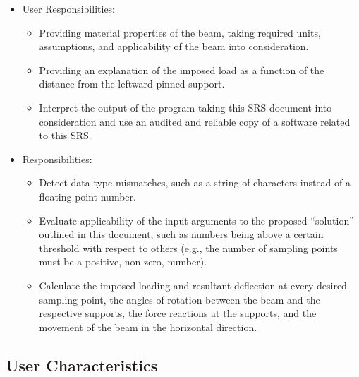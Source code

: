 \documentclass[12pt]{article}
\begin{document}
\begin{itemize}
    \item User Responsibilities:
          \begin{itemize}

              \item Providing material properties of the beam, taking required
                    units, assumptions, and applicability of the beam into
                    consideration.

              \item Providing an explanation of the imposed load as a function
                    of the distance from the leftward pinned support.

              \item Interpret the output of the program taking this SRS document
                    into consideration and use an audited and reliable copy of a
                    software related to this SRS.

          \end{itemize}

    \item \progname{} Responsibilities:
          \begin{itemize}

              \item Detect data type mismatches, such as a string of characters
                    instead of a floating point number.

              \item Evaluate applicability of the input arguments to the
                    proposed ``solution'' outlined in this document, such as
                    numbers being above a certain threshold with respect to
                    others (e.g., the number of sampling points must be a
                    positive, non-zero, number).

              \item Calculate the imposed loading and resultant deflection at
                    every desired sampling point, the angles of rotation between
                    the beam and the respective supports, the force reactions at
                    the supports, and the movement of the beam in the horizontal
                    direction.

          \end{itemize}
\end{itemize}

\subsection{User Characteristics} \label{SecUserCharacteristics}
\end{document}
